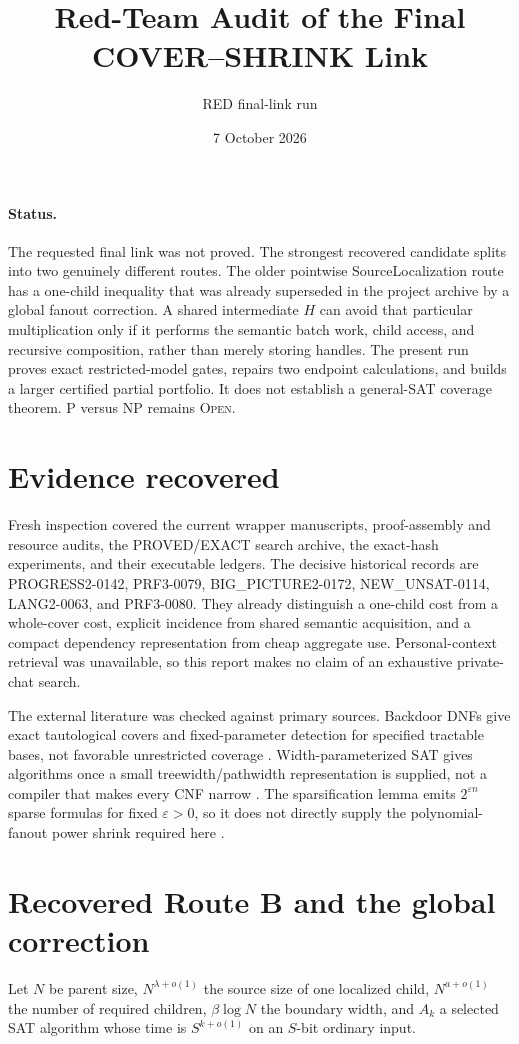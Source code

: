 \documentclass[11pt]{article}
\title{Red-Team Audit of the Final COVER--SHRINK Link}
\author{RED final-link run}
\date{7 October 2026}
\begin{document}
\maketitle

\paragraph{Status.}
The requested final link was not proved.  The strongest recovered candidate
splits into two genuinely different routes.  The older pointwise
SourceLocalization route has a one-child inequality that was already
superseded in the project archive by a global fanout correction.  A shared
intermediate $H$ can avoid that particular multiplication only if it performs
the semantic batch work, child access, and recursive composition, rather than
merely storing handles.  The present run proves exact restricted-model gates,
repairs two endpoint calculations, and builds a larger certified partial
portfolio.  It does not establish a general-SAT coverage theorem.  P versus NP
remains \textsc{Open}.

\section{Evidence recovered}
Fresh inspection covered the current wrapper manuscripts, proof-assembly and
resource audits, the PROVED/EXACT search archive, the exact-hash experiments,
and their executable ledgers.  The decisive historical records are
PROGRESS2-0142, PRF3-0079, BIG\_PICTURE2-0172, NEW\_UNSAT-0114,
LANG2-0063, and PRF3-0080.  They already distinguish a one-child cost from a
whole-cover cost, explicit incidence from shared semantic acquisition, and a
compact dependency representation from cheap aggregate use.  Personal-context
retrieval was unavailable, so this report makes no claim of an exhaustive
private-chat search.

The external literature was checked against primary sources.  Backdoor DNFs
give exact tautological covers and fixed-parameter detection for specified
tractable bases, not favorable unrestricted coverage \cite{ordyniak2021}.
Width-parameterized SAT gives algorithms once a small treewidth/pathwidth
representation is supplied, not a compiler that makes every CNF narrow
\cite{allender2014}.  The sparsification lemma emits $2^{\varepsilon n}$
sparse formulas for fixed $\varepsilon>0$, so it does not directly supply the
polynomial-fanout power shrink required here \cite{ipz2001}.

\section{Recovered Route B and the global correction}
Let $N$ be parent size, $N^{\lambda+o(1)}$ the source size of one localized
child, $N^{a+o(1)}$ the number of required children, $\beta\log N$ the
boundary width, and $A_k$ a selected SAT algorithm whose time is
$S^{k+o(1)}$ on an $S$-bit ordinary input.
\end{document}
